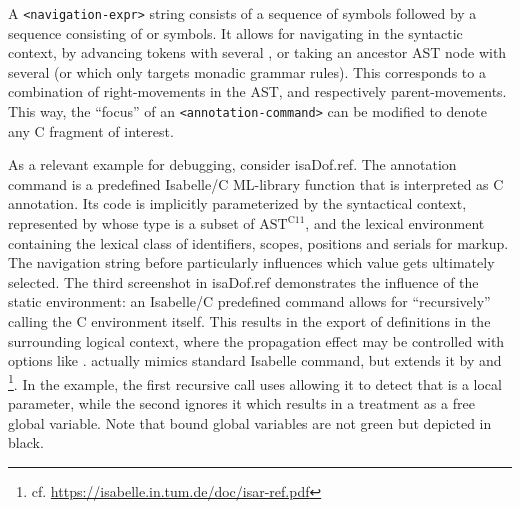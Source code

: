 \begin{isabellebody}
\begin{isamarkuptext}
A {\footnotesize\texttt{<navigation-expr>}} string consists of a sequence of \isa{{\isacharplus}} symbols followed
by a sequence consisting of \isa{{\isacharat}} or \isa{{\isacharampersand}} symbols. It allows for navigating
in the syntactic context, by advancing tokens with several \isa{{\isacharplus}}, or taking an ancestor
AST node with several \isa{{\isacharat}} (or \isa{{\isacharampersand}} which only targets monadic grammar rules). This
corresponds to a combination of right-movements in the AST, and respectively parent-movements. This
way, the ``focus'' of an {\footnotesize\texttt{<annotation-command>}} can be modified to denote any C
fragment of interest.%
\end{isamarkuptext}\isamarkuptrue%
%
\begin{isamarkuptext}%
As a relevant example for debugging, consider \csname isaDof.ref.
The annotation command  is a predefined Isabelle/C ML-library function that is
interpreted as C annotation. Its code is implicitly parameterized by the syntactical context,
represented by  whose type is a subset of
$\text{AST}^\text{C11}$, and the lexical environment  containing the
lexical class of identifiers, scopes, positions and serials for markup. The navigation string before
 particularly influences which
 value gets ultimately selected. The third screenshot in \csname isaDof.ref demonstrates the influence of the static environment: an Isabelle/C
predefined command  allows for ``recursively'' calling the C
environment itself. This results in the export of definitions in the surrounding logical context,
where the propagation effect may be controlled with options like
.  actually
mimics standard Isabelle  command, but extends it by
 and  \footnote{cf. \url{https://isabelle.in.tum.de/doc/isar-ref.pdf}}. In the
example, the first recursive call uses  allowing it to detect that
 is a local parameter, while the second ignores it which results in a treatment as a
free global variable. Note that bound global variables are not green but depicted in black.%
\end{isamarkuptext}\isamarkuptrue%
%
\begin{isamarkupsubsection*}%

\end{isamarkupsubsection*}
\end{isabellebody}
